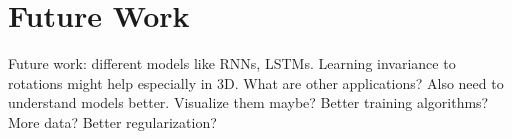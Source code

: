 \chapter{Future Work}

Future work: different models like RNNs, LSTMs. Learning
invariance to rotations might help especially in 3D. What are other
applications? Also need to understand models better. Visualize them maybe?
Better training algorithms? More data? Better regularization?
